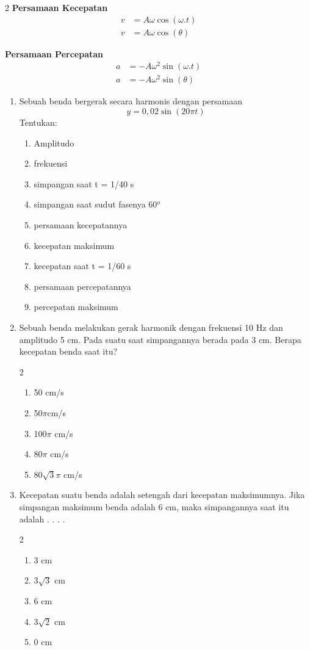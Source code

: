 \documentclass[10pt,a4paper]{extarticle}
\newcommand{\pilgani}[1]{                            \vspace{-0.3cm}\begin{multicols}{2}
 \begin{enumerate}[label=\Alph*., itemsep=0pt,topsep=0pt,leftmargin=*,align=Center]#1                     \end{enumerate}
 \phantom{ini cuma sapi, wedus, dan ayam}
 \end{multicols}}
\begin{document}
\begin{multicols*}{2}
\textbf{Persamaan Kecepatan}
\begin{align*}
v&=A\omega \cos(\omega.t)\\
v&=A\omega\cos(\theta)
\end{align*}

\textbf{Persamaan Percepatan}
\begin{align*}
a &= -A\omega^2\sin(\omega.t)\\
a &= -A\omega^2\sin(\theta)
\end{align*}

\vspace{2cm}

\begin{enumerate}
\item Sebuah benda bergerak secara harmonis dengan persamaan $$y = 0,02 \sin (20\pi t) $$
Tentukan:
\begin{enumerate}[noitemsep,label=\alph*.]
\item Amplitudo
\item frekuensi
\item simpangan saat t = 1/40 s
\item simpangan saat sudut fasenya 60$^o$
\item persamaan kecepatannya
\item kecepatan maksimum
\item kecepatan saat t = 1/60 s
\item persamaan percepatannya
\item percepatan maksimum
\end{enumerate}
\vspace{6cm}

\item Sebuah benda melakukan gerak harmonik dengan frekuensi 10 Hz dan amplitudo 5 cm. Pada suatu saat simpangannya berada pada 3 cm. Berapa kecepatan benda saat itu?
\pilgani{
\item 50 cm/s
\item 50$\pi$cm/s
\item 100$\pi$ cm/s
\item 80$\pi$ cm/s
\item 80$\sqrt{3}\pi$ cm/s
}
\vspace{3cm}

\item Kecepatan suatu benda adalah setengah dari kecepatan maksimumnya. Jika simpangan maksimum benda adalah 6 cm, maka simpangannya saat itu adalah . . . .
\pilgani{
\item 3 cm
\item 3$\sqrt{3}$ cm
\item 6 cm
\item 3$\sqrt{2}$ cm
\item 0 cm
}
\vspace{5cm}


\end{enumerate}
\end{multicols*}
\end{document}
